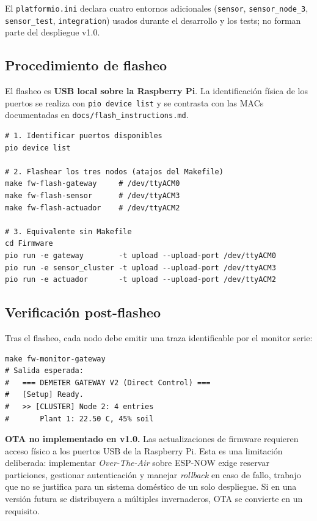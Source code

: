 El \texttt{platformio.ini} declara cuatro entornos adicionales (\texttt{sensor},
\texttt{sensor\_node\_3}, \texttt{sensor\_test}, \texttt{integration}) usados durante
el desarrollo y los tests; no forman parte del despliegue v1.0.

\subsection{Procedimiento de flasheo}

El flasheo es \textbf{USB local sobre la Raspberry Pi}. La identificación física de
los puertos se realiza con \texttt{pio device list} y se contrasta con las MACs
documentadas en \texttt{docs/flash\_instructions.md}.

\begin{lstlisting}[style=trama, caption={Flasheo de los tres nodos desde la Raspberry Pi}]
# 1. Identificar puertos disponibles
pio device list

# 2. Flashear los tres nodos (atajos del Makefile)
make fw-flash-gateway     # /dev/ttyACM0
make fw-flash-sensor      # /dev/ttyACM3
make fw-flash-actuador    # /dev/ttyACM2

# 3. Equivalente sin Makefile
cd Firmware
pio run -e gateway        -t upload --upload-port /dev/ttyACM0
pio run -e sensor_cluster -t upload --upload-port /dev/ttyACM3
pio run -e actuador       -t upload --upload-port /dev/ttyACM2
\end{lstlisting}

\subsection{Verificación post-flasheo}

Tras el flasheo, cada nodo debe emitir una traza identificable por el monitor serie:

\begin{lstlisting}[style=trama, caption={Verificación serie del gateway}]
make fw-monitor-gateway
# Salida esperada:
#   === DEMETER GATEWAY V2 (Direct Control) ===
#   [Setup] Ready.
#   >> [CLUSTER] Node 2: 4 entries
#       Plant 1: 22.50 C, 45% soil
\end{lstlisting}

\begin{warningbox}
\textbf{OTA no implementado en v1.0.} Las actualizaciones de firmware requieren
acceso físico a los puertos USB de la Raspberry Pi. Esta es una limitación
deliberada: implementar \textit{Over-The-Air} sobre ESP-NOW exige reservar
particiones, gestionar autenticación y manejar \textit{rollback} en caso de fallo,
trabajo que no se justifica para un sistema doméstico de un solo despliegue. Si en
una versión futura se distribuyera a múltiples invernaderos, OTA se convierte en un
requisito.
\end{warningbox}


